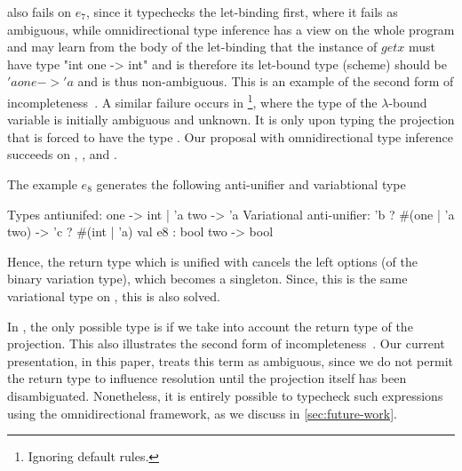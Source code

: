 \documentclass[acmsmall,screen,nonacm]{acmart}
\begin{document}
\OCaml also fails on \ocaml$e_7$, since it typechecks the let-binding first,
where it fails as ambiguous, while omnidirectional type inference has a view
on the whole program and may learn from the body of the let-binding that the
instance of $getx$ must have type \ocaml"int one -> int" and is therefore
its let-bound type (scheme) should be \ocaml$'a one -> 'a$ and is thus
non-ambiguous. This is an example of the second form of
incompleteness~.  A similar
failure occurs in \footnote{Ignoring default rules.}, where the
type of the $\lambda$-bound variable  is initially ambiguous and
unknown. It is only upon typing the projection  that  is
forced to have the type .
%
Our proposal with omnidirectional type inference succeeds
on , , and .
\begin{version}{}
\begin{version}{\Draft}
The example $e_8$ generates the following anti-unifier and variabtional
type
\begin{program}
Types antiunifed: one -> int | 'a two -> 'a
Variational anti-unifier: {'b ? {#(one | 'a two)}} -> {'c ? {#(int | 'a)}}
val e8 : bool two -> bool
\end{program}
Hence, the return type which is unified with  cancels the left
options (of the binary variation type), which becomes a singleton.  Since,
this is the same variational type on , this is also solved.
\end{version}
\end{version}

In , the only possible type is  if we take into account
the return type of the projection. This also illustrates the second
form of incompleteness~.
Our current presentation, in this paper, treats this term as ambiguous,
since we do not permit the return type to influence resolution until
the projection itself has been disambiguated. Nonetheless, it is
entirely possible to typecheck such expressions using the omnidirectional
framework, as we discuss in \cref{sec:future-work}.
\end{document}
